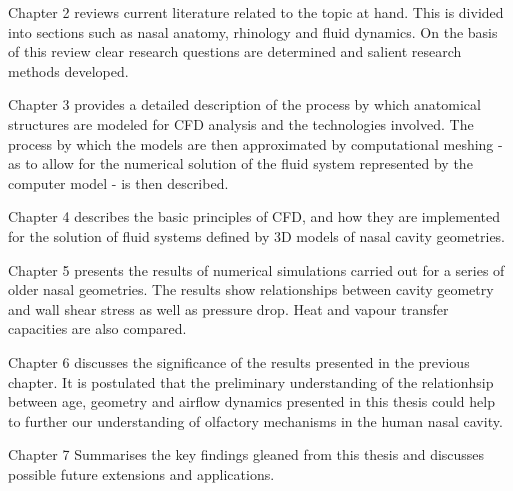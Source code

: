 \begin{description}
  \item{Chapter 2} reviews current literature related to the topic at hand. This is divided into sections such as nasal anatomy, rhinology and fluid dynamics. On the basis of this review clear research questions are determined and salient research methods developed.

  \item{Chapter 3} provides a detailed description of the process by which anatomical structures are modeled for CFD analysis and the technologies involved. The process by which the models are then approximated by computational meshing - as to allow for the numerical solution of the fluid system represented by the computer model - is then described.

  \item{Chapter 4} describes the basic principles of CFD, and how they are implemented for the solution of fluid systems defined by 3D models of nasal cavity geometries.

  \item{Chapter 5} presents the results of numerical simulations carried out for a series of older nasal geometries. The results show relationships between cavity geometry and wall shear stress as well as pressure drop. Heat and vapour transfer capacities are also compared.

  \item{Chapter 6} discusses the significance of the results presented in the previous chapter. It is postulated that the preliminary understanding of the relationhsip between age, geometry and airflow dynamics presented in this thesis could help to further our understanding of  olfactory mechanisms in the human nasal cavity.

  \item{Chapter 7} Summarises the key findings gleaned from this thesis and discusses possible future extensions and applications.

\end{description}
